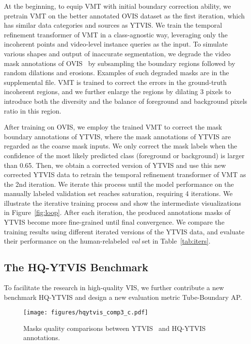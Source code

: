 \documentclass[runningheads]{llncs}
\begin{document}
At the beginning, to equip VMT with initial boundary correction ability, we pretrain VMT on the better annotated OVIS dataset as the first iteration, which has similar data categories and sources as YTVIS. We train the temporal refinement transformer of VMT in a class-agnostic way, leveraging only the incoherent points and video-level instance queries as the input. To simulate various shapes and output of inaccurate segmentation, we degrade the video mask annotations of OVIS~\cite{qi2021occluded} by subsampling the boundary regions followed by random dilations and erosions. Examples of such degraded masks are in the supplemental file. VMT is trained to correct the errors in the ground-truth incoherent regions, and we further enlarge the regions by dilating 3 pixels to introduce both the diversity and the balance of foreground and background pixels ratio in this region.


After training on OVIS, we employ the trained VMT to correct the mask boundary annotations of YTVIS, where the mask annotations of YTVIS are regarded as the coarse mask inputs. We only correct the mask labels when the confidence of the most likely predicted class (foreground or background) is larger than 0.65. Then, we obtain a corrected version of YTVIS and use this new corrected YTVIS data to retrain the temporal refinement transformer of VMT as the 2nd iteration. We iterate this process until the model performance on the manually labeled validation set reaches saturation, requiring 4 iterations. We illustrate the iterative training process and show the intermediate visualizations in Figure~\ref{fig:loop}. After each iteration, the produced annotations masks of YTVIS become more fine-grained until final convergence. We compare the training results using different iterated versions of the YTVIS data, and evaluate their performance on the human-relabeled \textit{val} set in Table~\ref{tab:iters}.



\subsection{The HQ-YTVIS Benchmark}\label{sec:hqvis}
To facilitate the research in high-quality VIS, we further contribute a new benchmark HQ-YTVIS and design a new evaluation metric Tube-Boundary AP.

\begin{figure}[!t]
	\centering
\texttt{[image: figures/hqytvis\_comp3\_c.pdf]}
\caption{Masks quality comparisons between YTVIS~\cite{yang2019video} and HQ-YTVIS annotations.}
\label{fig:hqytvis}
\end{figure}
\end{document}
